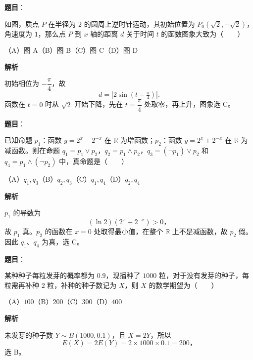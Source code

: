 \begin{answer}

\textbf{题目}：

如图，质点 $P$ 在半径为 $2$ 的圆周上逆时针运动，其初始位置为 $P_0(\sqrt2,-\sqrt2)$，角速度为 $1$，那么点 $P$ 到 $x$ 轴的距离 $d$ 关于时间 $t$ 的函数图象大致为\mbox{（　　）}
\nopagebreak[4]
\begin{center}\end{center}
\nopagebreak[4]
（A）图 A\quad（B）图 B\quad（C）图 C\quad（D）图 D

\textbf{解析}

初始相位为 $-\dfrac\pi4$，故
\nopagebreak[4]
\[
d=|2\sin(t-\tfrac\pi4)|.
\]
函数在 $t=0$ 时从 $\sqrt2$ 开始下降，先在 $t=\dfrac\pi4$ 处取零，再上升，图象选 C。


\end{answer}
\begin{answer}

\textbf{题目}：

已知命题 $p_1$：函数 $y=2^x-2^{-x}$ 在 $\mathbb R$ 为增函数；$p_2$：函数 $y=2^x+2^{-x}$ 在 $\mathbb R$ 为减函数。则在命题 $q_1=p_1\lor p_2$，$q_2=p_1\land p_2$，$q_3=(\lnot p_1)\lor p_2$ 和 $q_4=p_1\land(\lnot p_2)$ 中，真命题是\mbox{（　　）}

（A）$q_1,q_3$\quad（B）$q_2,q_3$\quad（C）$q_1,q_4$\quad（D）$q_2,q_4$

\textbf{解析}

$p_1$ 的导数为
\nopagebreak[4]
\[
(\ln2)(2^x+2^{-x})>0\text{，}
\]
故 $p_1$ 真。$p_2$ 的函数在 $x=0$ 处取得最小值，在整个 $\mathbb R$ 上不是减函数，故 $p_2$ 假。因此 $q_1\text{、}q_4$ 为真，选 C。


\end{answer}
\begin{answer}

\textbf{题目}：

某种种子每粒发芽的概率都为 $0.9$，现播种了 $1000$ 粒，对于没有发芽的种子，每粒需再补种 $2$ 粒，补种的种子数记为 $X$，则 $X$ 的数学期望为\mbox{（　　）}

（A）$100$\quad（B）$200$\quad（C）$300$\quad（D）$400$

\textbf{解析}

未发芽的种子数 $Y\sim B(1000,0.1)$，且 $X=2Y$，所以
\nopagebreak[4]
\[
E(X)=2E(Y)=2\times1000\times0.1=200\text{，}
\]
选 B。


\end{answer}
